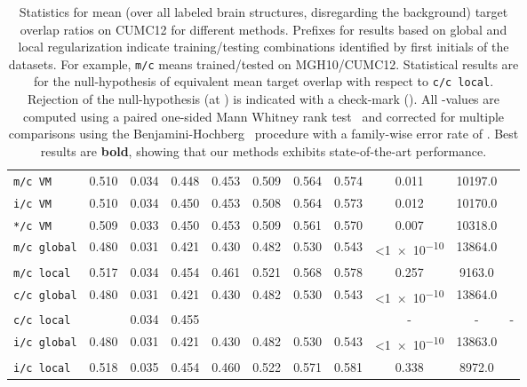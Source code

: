 \documentclass[10pt,twocolumn,letterpaper,table]{article}
\newcommand{\cmark}{\ding{51}}\newcommand{\xmark}{\ding{55}}
\numberwithin{equation}{section}
\theoremstyle{plain}
\theoremstyle{definition}
\begin{document}
\begin{table}
\begin{tiny}
{{\begin{tabular}{| l | c | c | c | c | c | c | c | c | c | c |}
			  \texttt{m/c VM} & 0.510 & 0.034 & 0.448 & 0.453 & 0.509 & 0.564 & 0.574 & 0.011 & 10197.0 & \cmark \\
			  \texttt{i/c VM} & 0.510 & 0.034 & 0.450 & 0.453 & 0.508 & 0.564 & 0.573 & 0.012 & 10170.0 & \cmark \\
			  \texttt{*/c VM} & 0.509 & 0.033 & 0.450 & 0.453 & 0.509 & 0.561 & 0.570 & 0.007 & 10318.0 & \cmark \\ \hline\hline
			  \texttt{m/c global} & 0.480 & 0.031 & 0.421 & 0.430 & 0.482 & 0.530 & 0.543 & \textless\num{1e-10} & 13864.0 & \cmark \\
			  \texttt{m/c local} & 0.517 & 0.034 & 0.454 & 0.461 & 0.521 & 0.568 & 0.578 & 0.257 & 9163.0 & \xmark \\ \hline\hline
			  \texttt{c/c global} & 0.480 & 0.031 & 0.421 & 0.430 & 0.482 & 0.530 & 0.543 & \textless\num{1e-10} & 13864.0 & \cmark \\
			  \texttt{c/c local} &  \cellcolor{green!30}{\bf 0.520} & 0.034 & 0.455 &  \cellcolor{green!30}{\bf 0.463} &  \cellcolor{green!30}{\bf 0.524} &  \cellcolor{green!30}{\bf 0.572} &  \cellcolor{green!30}{\bf 0.581} & - & - & - \\ \hline\hline
			  \texttt{i/c global} & 0.480 & 0.031 & 0.421 & 0.430 & 0.482 & 0.530 & 0.543 & \textless\num{1e-10} & 13863.0 & \cmark \\
			  \texttt{i/c local} & 0.518 & 0.035 & 0.454 & 0.460 & 0.522 & 0.571 & 0.581 & 0.338 & 8972.0 & \xmark \\
			\hline
		\end{tabular}
}}
  \caption{Statistics for mean (over all labeled brain structures, disregarding the background) target overlap ratios on CUMC12 for different methods. Prefixes for results based on global and local regularization indicate training/testing combinations identified by first initials of the datasets. For example, \texttt{m/c} means trained/tested on MGH10/CUMC12. Statistical results are for the null-hypothesis of equivalent mean target overlap with respect to \texttt{c/c local}. Rejection of the null-hypothesis (at ) is indicated with a check-mark (\cmark). All -values are computed using a paired one-sided Mann Whitney rank test~\cite{mann1947} and corrected for multiple comparisons using the Benjamini-Hochberg~\cite{benjamini1995} procedure with a family-wise error rate of . Best results are \textbf{bold}, showing that our methods exhibits state-of-the-art performance.}
        \label{tab:target_overlap_3d_cumc12}
\end{tiny}
\end{table}
\end{document}
